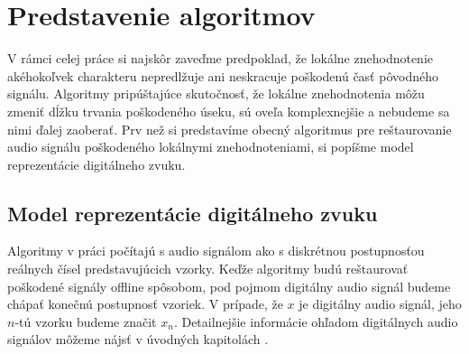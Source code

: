 
\chapter{Predstavenie algoritmov}
V rámci celej práce si najskôr zaveďme predpoklad, že lokálne znehodnotenie akéhokoľvek charakteru nepredlžuje ani neskracuje poškodenú časť pôvodného signálu. Algoritmy pripúštajúce skutočnosť, že lokálne znehodnotenia môžu zmeniť dĺžku trvania poškodeného úseku, sú oveľa komplexnejšie a nebudeme sa nimi ďalej zaoberať. Prv než si predstavíme obecný algoritmus pre reštaurovanie audio signálu poškodeného lokálnymi znehodnoteniami, si popíšme model reprezentácie digitálneho zvuku.

\section{Model reprezentácie digitálneho zvuku}
Algoritmy v práci počítajú s audio signálom ako s diskrétnou postupnosťou reálnych čísel predstavujúcich vzorky. Keďže algoritmy budú reštaurovať poškodené signály offline spôsobom, pod pojmom digitálny audio signál budeme chápať konečnú postupnosť vzoriek. V prípade, že $x$ je digitálny audio signál, jeho $n$-tú vzorku budeme značit $x_n$. Detailnejšie informácie ohľadom digitálnych audio signálov môžeme nájsť v úvodných kapitolách \cite{Godsill}.

